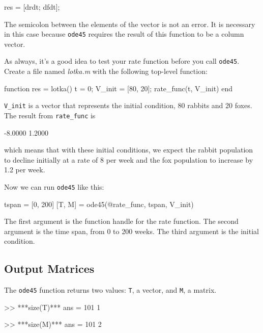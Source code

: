 \begin{code}
    res = [drdt; dfdt];
\end{code}

The semicolon between the elements of the vector is not an error.  It
is necessary in this case because \lstinline{ode45} requires the result of
this function to be a column vector.


As always, it's a good idea to test your rate function before you call \lstinline{ode45}.  
Create a file named \emph{lotka.m} with the following top-level function:

\begin{code}
function res = lotka()
    t = 0;
    V_init = [80, 20];
    rate_func(t, V_init)
end
\end{code}


\lstinline{V_init} is a vector that represents the initial condition, 80 rabbits and 20 foxes.  
The result from \lstinline{rate_func} is

\begin{code}
-8.0000
 1.2000
 \end{code}
which means that with these initial conditions, we expect the rabbit population to decline initially at a rate of 8 per week and the fox population to increase by 1.2 per week.  
  
Now we can run \lstinline{ode45} like this:

\begin{code}
tspan = [0, 200]
[T, M] = ode45(@rate_func, tspan, V_init)
\end{code}

The first argument is the function handle for the rate function.
The second argument is the time span, from 0 to 200 weeks.
The third argument is the initial condition.



\subsection{Output Matrices}

The \lstinline{ode45} function returns two values: \lstinline{T}, a vector, 
and \lstinline{M}, a matrix.

\begin{code}
>> ***size(T)***
ans = 101     1

>> ***size(M)***
ans = 101     2
\end{code}

